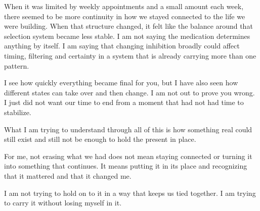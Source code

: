\documentclass[10pt,twocolumn]{article}
\begin{document}
When it was limited by weekly appointments and a small amount each week, there seemed to be more continuity in how we stayed connected to the life we were building. When that structure changed, it felt like the balance around that selection system became less stable. I am not saying the medication determines anything by itself. I am saying that changing inhibition broadly could affect timing, filtering and certainty in a system that is already carrying more than one pattern.

I see how quickly everything became final for you, but I have also seen how different states can take over and then change. I am not out to prove you wrong. I just did not want our time to end from a moment that had not had time to stabilize.

What I am trying to understand through all of this is how something real could still exist and still not be enough to hold the present in place.

For me, not erasing what we had does not mean staying connected or turning it into something that continues. It means putting it in its place and recognizing that it mattered and that it changed me.

I am not trying to hold on to it in a way that keeps us tied together. I am trying to carry it without losing myself in it.
\end{document}
